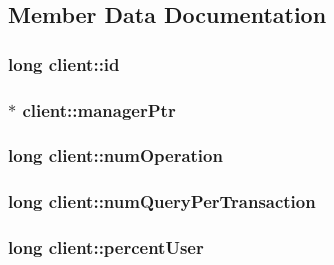 \subsection{Member Data Documentation}
\hypertarget{structclient_a17b1f9e5542f77e621ec01dde50cf093}{
\subsubsection[{id}]{\setlength{\rightskip}{0pt plus 5cm}long client\-::id}}\label{structclient_a17b1f9e5542f77e621ec01dde50cf093}
\hypertarget{structclient_ad1efda1a2b9eed0662ecabd1d26dbd94}{
\subsubsection[{manager\-Ptr}]{$\ast$ client\-::manager\-Ptr}}\label{structclient_ad1efda1a2b9eed0662ecabd1d26dbd94}
\hypertarget{structclient_aadedfaf2dd96ab91745c50d53882ec00}{
\subsubsection[{num\-Operation}]{\setlength{\rightskip}{0pt plus 5cm}long client\-::num\-Operation}}\label{structclient_aadedfaf2dd96ab91745c50d53882ec00}
\hypertarget{structclient_a9c193c4ffa92748767798b53793c8ee5}{
\subsubsection[{num\-Query\-Per\-Transaction}]{\setlength{\rightskip}{0pt plus 5cm}long client\-::num\-Query\-Per\-Transaction}}\label{structclient_a9c193c4ffa92748767798b53793c8ee5}
\hypertarget{structclient_a726a5aef2e634d11e4f58fbd485fd211}{
\subsubsection[{percent\-User}]{\setlength{\rightskip}{0pt plus 5cm}long client\-::percent\-User}}\label{structclient_a726a5aef2e634d11e4f58fbd485fd211}
